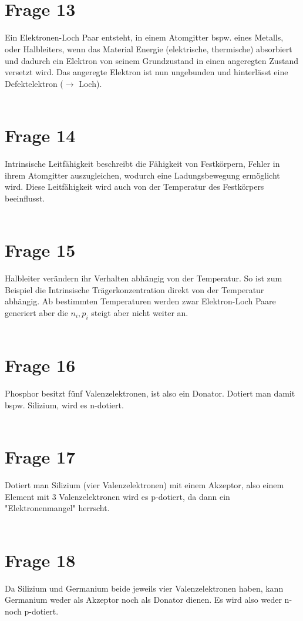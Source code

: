 \documentclass[a4paper]{scrartcl}
\begin{document}
~\\
~\\
\section*{Frage 13}
Ein Elektronen-Loch Paar entsteht, in einem Atomgitter bspw. eines Metalls, oder Halbleiters, wenn das Material Energie (elektrische, thermische) absorbiert und dadurch ein Elektron von seinem Grundzustand in einen angeregten Zustand versetzt wird. Das angeregte Elektron ist nun ungebunden und hinterlässt eine Defektelektron ($\rightarrow$ Loch).
~\\
~\\
\section*{Frage 14}
Intrinsische Leitfähigkeit beschreibt die Fähigkeit von Festkörpern, Fehler in ihrem Atomgitter auszugleichen, wodurch eine Ladungsbewegung ermöglicht wird. Diese Leitfähigkeit wird auch von der Temperatur des Festkörpers beeinflusst.
~\\
~\\
\section*{Frage 15}
Halbleiter verändern ihr Verhalten abhängig von der Temperatur. So ist zum Beispiel die Intrinsische Trägerkonzentration direkt von der Temperatur abhängig. Ab bestimmten Temperaturen werden zwar Elektron-Loch Paare generiert aber die $n_i, p_i$ steigt aber nicht weiter an.
~\\
~\\
\section*{Frage 16}
Phosphor besitzt fünf Valenzelektronen, ist also ein Donator. Dotiert man damit bspw. Silizium, wird es n-dotiert.
~\\
~\\
\section*{Frage 17}
Dotiert man Silizium (vier Valenzelektronen) mit einem Akzeptor, also einem Element mit 3 Valenzelektronen wird es p-dotiert, da dann ein "Elektronenmangel" herrscht.
~\\
~\\
\section*{Frage 18}
Da Silizium und Germanium beide jeweils vier Valenzelektronen haben, kann Germanium weder als Akzeptor noch als Donator dienen. Es wird also weder n- noch p-dotiert.
~\\
~\\
\end{document}
